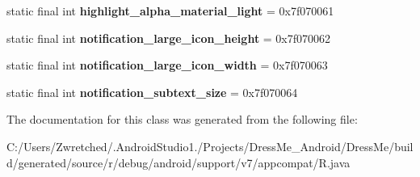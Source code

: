 \begin{DoxyCompactItemize}
\item 
\hypertarget{classandroid_1_1support_1_1v7_1_1appcompat_1_1_r_1_1dimen_a86a754bbbd93cc196da3b0b984a92c32}{}static final int {\bfseries highlight\+\_\+alpha\+\_\+material\+\_\+light} = 0x7f070061\label{classandroid_1_1support_1_1v7_1_1appcompat_1_1_r_1_1dimen_a86a754bbbd93cc196da3b0b984a92c32}

\item 
\hypertarget{classandroid_1_1support_1_1v7_1_1appcompat_1_1_r_1_1dimen_a2319b159ed59b8c5f1abd6eff006013a}{}static final int {\bfseries notification\+\_\+large\+\_\+icon\+\_\+height} = 0x7f070062\label{classandroid_1_1support_1_1v7_1_1appcompat_1_1_r_1_1dimen_a2319b159ed59b8c5f1abd6eff006013a}

\item 
\hypertarget{classandroid_1_1support_1_1v7_1_1appcompat_1_1_r_1_1dimen_af2b2c0883067d2ce7b558856794f1d29}{}static final int {\bfseries notification\+\_\+large\+\_\+icon\+\_\+width} = 0x7f070063\label{classandroid_1_1support_1_1v7_1_1appcompat_1_1_r_1_1dimen_af2b2c0883067d2ce7b558856794f1d29}

\item 
\hypertarget{classandroid_1_1support_1_1v7_1_1appcompat_1_1_r_1_1dimen_a22988b81668da9a88c915c93f07a65dc}{}static final int {\bfseries notification\+\_\+subtext\+\_\+size} = 0x7f070064\label{classandroid_1_1support_1_1v7_1_1appcompat_1_1_r_1_1dimen_a22988b81668da9a88c915c93f07a65dc}

\end{DoxyCompactItemize}


The documentation for this class was generated from the following file\+:\begin{DoxyCompactItemize}
\item 
C\+:/\+Users/\+Zwretched/.\+Android\+Studio1./\+Projects/\+Dress\+Me\+\_\+\+Android/\+Dress\+Me/build/generated/source/r/debug/android/support/v7/appcompat/R.\+java\end{DoxyCompactItemize}
